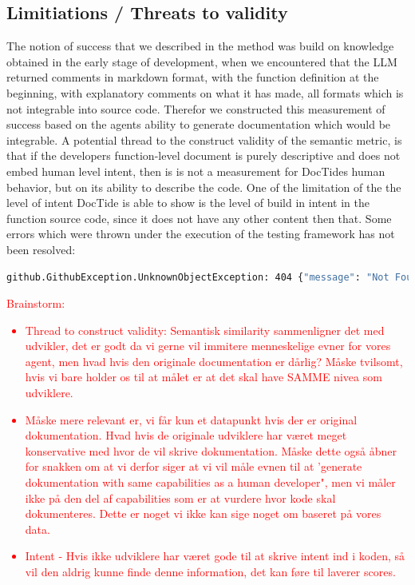 \subsection{Limitiations / Threats to validity}
The notion of success that we described in the method  was build on knowledge obtained in the early stage of development, when we encountered that the LLM returned comments in markdown format, with the function definition at the beginning, with explanatory comments on what it has made, all formats which is not integrable into source code. Therefor we constructed this measurement of success based on the agents ability to generate documentation which would be integrable.
A potential thread to the construct validity of the semantic metric, is that if the developers function-level document is purely descriptive and does not embed human level intent, then is is not a measurement for DocTides human behavior, but on its ability to describe the code. One of the limitation of the the level of intent DocTide is able to show is the level of build in intent in the function source code, since it does not have any other content then that. Some errors which were thrown under the execution of the testing framework has not been resolved:
\begin{lstlisting}[language=bash, label={lst:unresolved_errors}, caption=Unresloved errors ]
    github.GithubException.UnknownObjectException: 404 {"message": "Not Found", "documentation_url": "https://docs.github.com/rest/repos/contents#get-repository-content", "status": "404"}
\end{lstlisting}

\textcolor{red}{Brainstorm: \begin{itemize}
    \item Thread to construct validity: Semantisk similarity sammenligner det med udvikler, det er godt da vi gerne vil immitere menneskelige evner for vores agent, men hvad hvis den originale documentation er dårlig? Måske tvilsomt, hvis vi bare holder os til at målet er at det skal have SAMME nivea som udviklere.
    \item Måske mere relevant er, vi får kun et datapunkt hvis der er original dokumentation. Hvad hvis de originale udviklere har været meget konservative med hvor de vil skrive dokumentation. Måske dette også åbner for snakken om at vi derfor siger at vi vil måle evnen til at 'generate dokumentation with same capabilities as a human developer", men vi måler ikke på den del af capabilities som er at vurdere hvor kode skal dokumenteres. Dette er noget vi ikke kan sige noget om baseret på vores data.
    \item Intent - Hvis ikke udviklere har været gode til at skrive intent ind i koden, så vil den aldrig kunne finde denne information, det kan føre til laverer scores.
\end{itemize}}